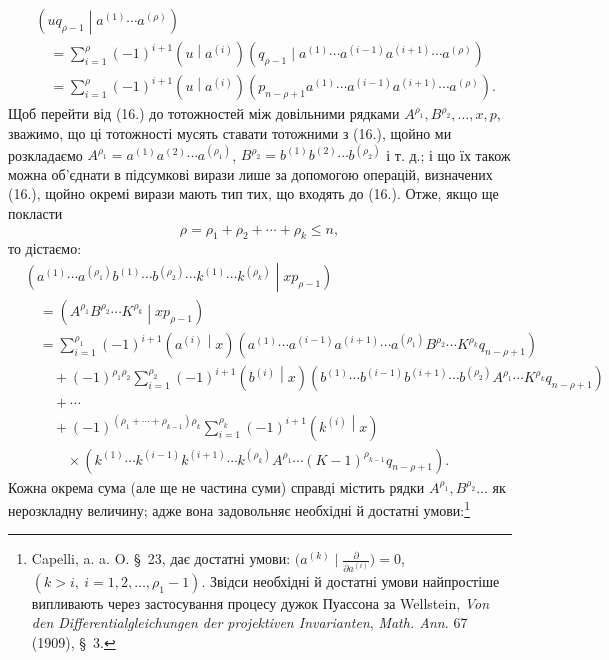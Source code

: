 \documentclass[11pt]{article}
\newcommand{\pair}[2]{\left(#1\middle|#2\right)}
\begin{document}
\begin{equation}
\begin{aligned}
&\pair{u q_{\rho-1}}{a^{(1)}\cdots a^{(\rho)}}\\
&\quad=\sum_{i=1}^{\rho}(-1)^{i+1}\pair{u}{a^{(i)}}
(q_{\rho-1}\mid a^{(1)}\cdots a^{(i-1)}a^{(i+1)}\cdots a^{(\rho)})\\
&\quad=\sum_{i=1}^{\rho}(-1)^{i+1}\pair{u}{a^{(i)}}
(p_{n-\rho+1}a^{(1)}\cdots a^{(i-1)}a^{(i+1)}\cdots a^{(\rho)}).
\end{aligned}
\tag{17}
\end{equation}
Щоб перейти від (16.) до тотожностей між довільними рядками $A^{\rho_1},B^{\rho_2},\ldots,x,p$, зважимо, що ці тотожності мусять ставати тотожними з (16.), щойно ми розкладаємо $A^{\rho_1}=a^{(1)}a^{(2)}\cdots a^{(\rho_1)}$, $B^{\rho_2}=b^{(1)}b^{(2)}\cdots b^{(\rho_2)}$ і т. д.; і що їх також можна об'єднати в підсумкові вирази лише за допомогою операцій, визначених (16.), щойно окремі вирази мають тип тих, що входять до (16.). Отже, якщо ще покласти
\begin{equation}
 \rho=\rho_1+\rho_2+\cdots+\rho_k\le n,
\tag{18}
\end{equation}
то дістаємо:
\[
\begin{aligned}
&\pair{a^{(1)}\cdots a^{(\rho_1)}b^{(1)}\cdots b^{(\rho_2)}
\cdots k^{(1)}\cdots k^{(\rho_k)}}{xp_{\rho-1}}\\
&\quad=\pair{A^{\rho_1}B^{\rho_2}\cdots K^{\rho_k}}{xp_{\rho-1}} \\
&\quad=\sum_{i=1}^{\rho_1}(-1)^{i+1}\pair{a^{(i)}}{x}
(a^{(1)}\cdots a^{(i-1)}a^{(i+1)}\cdots a^{(\rho_1)}
B^{\rho_2}\cdots K^{\rho_k}q_{n-\rho+1})\\
&\qquad+(-1)^{\rho_1\rho_2}\sum_{i=1}^{\rho_2}(-1)^{i+1}\pair{b^{(i)}}{x}
(b^{(1)}\cdots b^{(i-1)}b^{(i+1)}\cdots b^{(\rho_2)}
A^{\rho_1}\cdots K^{\rho_k}q_{n-\rho+1})\\
&\qquad+\cdots\\
&\qquad+(-1)^{(\rho_1+\cdots+\rho_{k-1})\rho_k}
\sum_{i=1}^{\rho_k}(-1)^{i+1}\pair{k^{(i)}}{x}\\
&\qquad\quad\times
(k^{(1)}\cdots k^{(i-1)}k^{(i+1)}\cdots k^{(\rho_k)}
A^{\rho_1}\cdots (K-1)^{\rho_{k-1}}q_{n-\rho+1}).
\end{aligned}
\]
Кожна окрема сума (але ще не частина суми) справді містить рядки $A^{\rho_1},B^{\rho_2}\ldots$ як нерозкладну величину; адже вона задовольняє необхідні й достатні умови:\footnote{Capelli, a. a. O. \S\ 23, дає достатні умови: $\bigl(a^{(k)}\mid \frac{\partial}{\partial a^{(i)}}\bigr)=0$, $(k>i,\ i=1,2,\ldots,\rho_1-1)$. Звідси необхідні й достатні умови найпростіше випливають через застосування процесу дужок Пуассона за Wellstein, \emph{Von den Differentialgleichungen der projektiven Invarianten}, \emph{Math. Ann.} 67 (1909), \S\ 3.}
\end{document}
